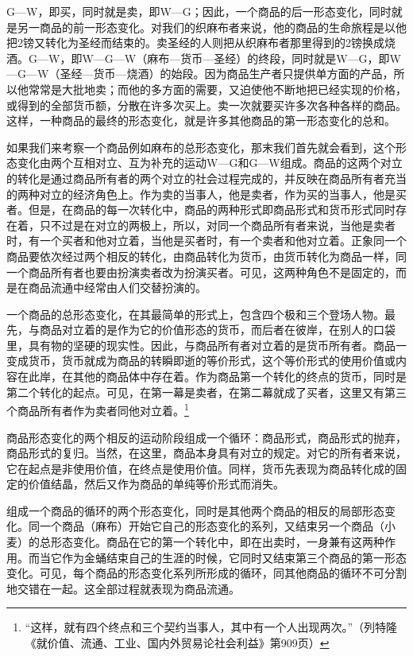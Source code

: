 \documentclass{ctexbook}
\begin{document}
        G—W，即买，同时就是卖，即W—G；因此，一个商品的后一形态变化，同时就是另一商品的前一形态变化。对我们的织麻布者来说，他的商品的生命旅程是以他把2镑又转化为圣经而结束的。卖圣经的人则把从织麻布者那里得到的2镑换成烧酒。G—W，即W—G—W（麻布—货币—圣经）的终段，同时就是W—G，即W—G—W（圣经—货币—烧酒）的始段。因为商品生产者只提供单方面的产品，所以他常常是大批地卖；而他的多方面的需要，又迫使他不断地把已经实现的价格，或得到的全部货币额，分散在许多次买上。卖一次就要买许多次各种各样的商品。这样，一种商品的最终的形态变化，就是许多其他商品的第一形态变化的总和。
        
        如果我们来考察一个商品例如麻布的总形态变化，那末我们首先就会看到，这个形态变化由两个互相对立、互为补充的运动W—G和G—W组成。商品的这两个对立的转化是通过商品所有者的两个对立的社会过程完成的，并反映在商品所有者充当的两种对立的经济角色上。作为卖的当事人，他是卖者，作为买的当事人，他是买者。但是，在商品的每一次转化中，商品的两种形式即商品形式和货币形式同时存在着，只不过是在对立的两极上，所以，对同一个商品所有者来说，当他是卖者时，有一个买者和他对立着，当他是买者时，有一个卖者和他对立着。正象同一个商品要依次经过两个相反的转化，由商品转化为货币，由货币转化为商品一样，同一个商品所有者也要由扮演卖者改为扮演买者。可见，这两种角色不是固定的，而是在商品流通中经常由人们交替扮演的。
        
        一个商品的总形态变化，在其最简单的形式上，包含四个极和三个登场人物。最先，与商品对立着的是作为它的价值形态的货币，而后者在彼岸，在别人的口袋里，具有物的坚硬的现实性。因此，与商品所有者对立着的是货币所有者。商品一变成货币，货币就成为商品的转瞬即逝的等价形式，这个等价形式的使用价值或内容在此岸，在其他的商品体中存在着。作为商品第一个转化的终点的货币，同时是第二个转化的起点。可见，在第一幕是卖者，在第二幕就成了买者，这里又有第三个商品所有者作为卖者同他对立着。\footnote{“这样，就有四个终点和三个契约当事人，其中有一个人出现两次。”（列特隆《就价值、流通、工业、国内外贸易论社会利益》第909页）}
        
        商品形态变化的两个相反的运动阶段组成一个循环：商品形式，商品形式的抛弃，商品形式的复归。当然，在这里，商品本身具有对立的规定。对它的所有者来说，它在起点是非使用价值，在终点是使用价值。同样，货币先表现为商品转化成的固定的价值结晶，然后又作为商品的单纯等价形式而消失。
        
        组成一个商品的循环的两个形态变化，同时是其他两个商品的相反的局部形态变化。同一个商品（麻布）开始它自己的形态变化的系列，又结束另一个商品（小麦）的总形态变化。商品在它的第一个转化中，即在出卖时，一身兼有这两种作用。而当它作为金蛹结束自己的生涯的时候，它同时又结束第三个商品的第一形态变化。可见，每个商品的形态变化系列所形成的循环，同其他商品的循环不可分割地交错在一起。这全部过程就表现为商品流通。
        
\end{document}
